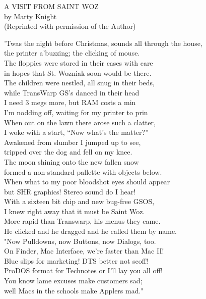 \documentclass{report}
\newenvironment{usenet}{\raggedright\small\ttfamily}{\rmfamily}
\begin{document}
	\begin{usenet}
		A VISIT FROM SAINT WOZ\\
		by Marty Knight\\
		(Reprinted with permission of the Author)

		'Twas the night before Christmas, sounds all through the house,\\
		the printer a'buzzing; the clicking of mouse.\\
		The floppies were stored in their cases with care\\
		in hopes that St. Wozniak soon would be there.\\
		The children were nestled, all snug in their beds,\\
		while TransWarp GS's danced in their head\\
		I need 3 megs more, but RAM costs a min\\
		I'm nodding off, waiting for my printer to prin\\
		When out on the lawn there arose such a clatter,\\
		I woke with a start, ``Now what's the matter?''\\
		Awakened from slumber I jumped up to see,\\
		tripped over the dog and fell on my knee.\\
		The moon shining onto the new fallen snow\\
		formed a non-standard pallette with objects below.\\
		When what to my poor bloodshot eyes should appear\\
		but SHR graphics! Stereo sound do I hear!\\
		With a sixteen bit chip and new bug-free GSOS,\\
		I knew right away that it must be Saint Woz.\\
		More rapid than Transwarp, his menus they came.\\
		He clicked and he dragged and he called them by name.\\
		"Now Pulldowns, now Buttons, now Dialogs, too.\\
		On Finder, Mac Interface, we're faster than Mac II!\\
		Blue slips for marketing! DTS better not scoff!\\
		ProDOS format for Technotes or I'll lay you all off!\\
		You know lame excuses make customers sad;\\
		well Macs in the schools make Applers mad."\\

\end{usenet}
\end{document}
